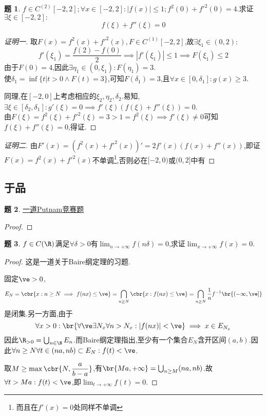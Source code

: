\documentclass{article}
\theoremstyle{definition}
\newtheorem{exercise}{题}[section]
\begin{document}
\begin{exercise}
    $f\in C^{(2)}[-2,2];\forall x\in[-2,2]:|f(x)|\leq 1;f^2(0)+f'^2(0)=4$.求证$\exists \xi\in[-2,2]:$\[f(\xi)+f''(\xi)=0\]
\end{exercise}
\begin{proof}[证明一]
    取$F(x)=f^2(x)+f'^2(x),F\in C^{(1)}[-2,2]$,故$\exists \xi_1\in(0,2):$
    \[f'(\xi_1)=\frac{f(2)-f(0)}{2}\implies |f'(\xi_1)|\leq 1\implies F(\xi_1)\leq 2\]
    由于$F(0)=4$,因此$\exists \eta_1\in(0,\xi_1):F(\eta_1)=3$.\\ 
    使$\delta_1=\inf\{t|t>0\land F(t)=3\}$,可知$F(\delta_1)=3$,且$\forall x\in[0,\delta_1]:g(x)\geq 3$.
    
    同理,在$[-2,0]$上考虑相应的$\xi_2,\eta_2,\delta_2$.易知,$\exists \xi\in[\delta_2,\delta_1]:g'(\xi)=0\implies f'(\xi)\left( f(\xi)+f''(\xi) \right)=0$.\\ 由$F(\xi)=f^2(\xi)+f'^2(\xi)=3>1=f^2(\xi)\implies f'(\xi)\neq 0$可知$f(\xi)+f''(\xi)=0$,得证.
\end{proof}
\begin{proof}[证明二]
    由$F'(x)=\left( f^2(x)+f'^2(x) \right)'=2f'(x)\left( f(x)+f''(x) \right)$,即证$F(x)=f^2(x)+f'^2(x)$不单调\footnote{而且在$f'(x)=0$处同样不单调},否则必在$[-2,0)$或$(0,2]$中有
\end{proof}

\subsection{于品}
\begin{exercise}
    \href{https://chaoli.club/index.php/7253}{一道Putnam竞赛题}
\end{exercise}
\begin{proof}
    
\end{proof}

\begin{exercise}
    $f\in C(\R)$满足$\forall \delta>0$有$\lim_{n\to+\infty}f(n\delta)=0$,求证$\lim_{x\to+\infty}f(x)=0$.
\end{exercise}
\begin{proof}
    这是一道关于Baire纲定理的习题.

    固定$\ve>0$,
    $$E_N=\cbr{x:n\geq N\implies f(nx)\leq \ve}=\bigcap_{n\geq N}\cbr{x:f(nx)\leq \ve}=\bigcap_{n\geq N}\frac{1}{n}f^{-1}\br{(-\infty,\ve]}$$
    是闭集.另一方面,由于
    $$\forall x>0:\br{\forall\ve\exists N_x\forall n>N_x:|f(nx)|<\ve}\implies x\in E_{N_x}$$
    因此$ \R_{>0}=\bigcup_{n\in \N}E_n$.而Baire纲定理指出,至少有一个集合$E_N$含开区间$(a,b)$.因此$\forall n\geq N\forall t\in (na,nb)\subset E_N:f(t)<\ve$.

    取$M\geq \max\cbr{N,\dfrac{a}{b-a}}$,有$ \br{Ma,+\infty}=\bigcup_{n\geq M}(na,nb)$.故$\forall t>Ma:f(t)<\ve$,即$\lim_{t\to+\infty}f(t)=0$.
\end{proof}
\end{document}
